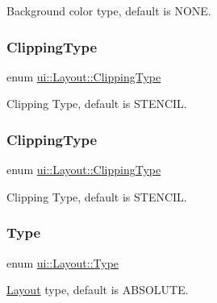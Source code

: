 Background color type, default is N\+O\+NE. \mbox{\label{classui_1_1Layout_acd2a398e83d7d467e9565d4db171c865}} 
\subsubsection{\texorpdfstring{Clipping\+Type}{ClippingType}\hspace{0.1cm}{\footnotesize\ttfamily [1/2]}}
{\footnotesize\ttfamily enum \hyperlink{classui_1_1Layout_acd2a398e83d7d467e9565d4db171c865}{ui\+::\+Layout\+::\+Clipping\+Type}\hspace{0.3cm}{\ttfamily [strong]}}

Clipping Type, default is S\+T\+E\+N\+C\+IL. \mbox{\label{classui_1_1Layout_acd2a398e83d7d467e9565d4db171c865}} 
\subsubsection{\texorpdfstring{Clipping\+Type}{ClippingType}\hspace{0.1cm}{\footnotesize\ttfamily [2/2]}}
{\footnotesize\ttfamily enum \hyperlink{classui_1_1Layout_acd2a398e83d7d467e9565d4db171c865}{ui\+::\+Layout\+::\+Clipping\+Type}\hspace{0.3cm}{\ttfamily [strong]}}

Clipping Type, default is S\+T\+E\+N\+C\+IL. \mbox{\label{classui_1_1Layout_aecabbc1592677eadd6757edc1df5b952}} 
\subsubsection{\texorpdfstring{Type}{Type}\hspace{0.1cm}{\footnotesize\ttfamily [1/2]}}
{\footnotesize\ttfamily enum \hyperlink{classui_1_1Layout_aecabbc1592677eadd6757edc1df5b952}{ui\+::\+Layout\+::\+Type}\hspace{0.3cm}{\ttfamily [strong]}}

\hyperlink{classui_1_1Layout}{Layout} type, default is A\+B\+S\+O\+L\+U\+TE. \mbox{\label{classui_1_1Layout_aecabbc1592677eadd6757edc1df5b952}} 
